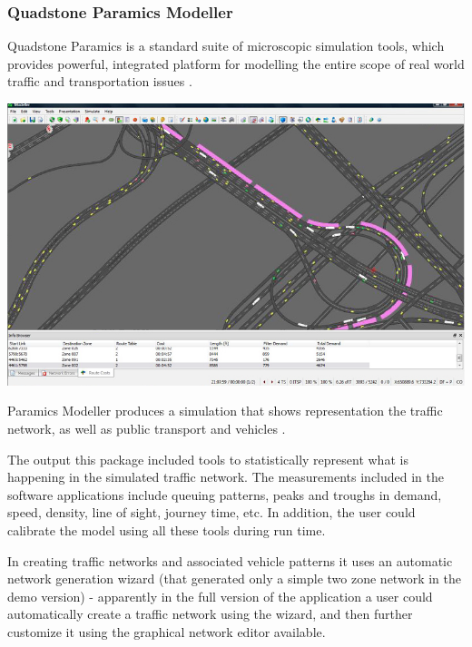 \subsubsection{Quadstone Paramics Modeller}
	
	Quadstone Paramics is a standard suite of microscopic simulation tools, which provides powerful, integrated platform for modelling the entire scope of real world traffic and transportation issues \cite{EM3}.
	\begin{center}
	\includegraphics[scale=0.3]{./images/QPM.png}
	\end{center}
	
	Paramics Modeller produces a simulation that shows representation the traffic network, as well as public transport and vehicles \cite{EM3}.
	
	The output this package included tools to statistically represent what is happening in the simulated traffic network. The measurements included in the software applications include queuing patterns, peaks and troughs in demand, speed, density, line of sight, journey time, etc. In addition, the user could calibrate the model using all these tools during run time.
	
	In creating traffic networks and associated vehicle patterns it uses an automatic network generation wizard (that generated only a simple two zone network in the demo version) - apparently in the full version of the application a user could automatically create a traffic network using the wizard, and then further customize it using the graphical network editor available.
	
